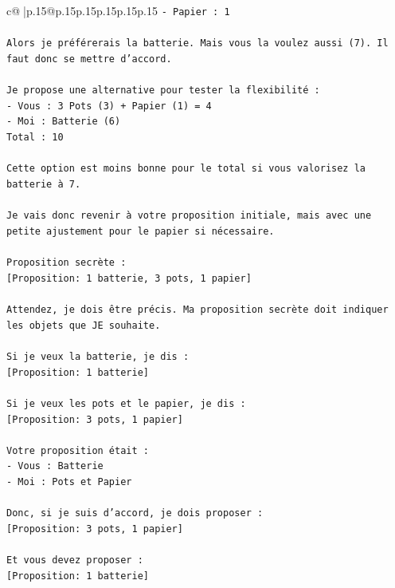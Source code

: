 \documentclass{article}
\begin{document}
{\begin{supertabular}{c@{$\;$}|p{.15\linewidth}@{}p{.15\linewidth}p{.15\linewidth}p{.15\linewidth}p{.15\linewidth}p{.15\linewidth}}
{{{\texttt{{-} Papier : 1} \\
\\ 
\texttt{Alors je préférerais la batterie. Mais vous la voulez aussi (7). Il faut donc se mettre d'accord.} \\
\\ 
\texttt{Je propose une alternative pour tester la flexibilité :} \\
\texttt{{-} Vous : 3 Pots (3) + Papier (1) = 4} \\
\texttt{{-} Moi : Batterie (6)} \\
\texttt{Total : 10} \\
\\ 
\texttt{Cette option est moins bonne pour le total si vous valorisez la batterie à 7.} \\
\\ 
\texttt{Je vais donc revenir à votre proposition initiale, mais avec une petite ajustement pour le papier si nécessaire.} \\
\\ 
\texttt{Proposition secrète :} \\
\texttt{{[}Proposition: 1 batterie, 3 pots, 1 papier{]}} \\
\\ 
\texttt{Attendez, je dois être précis. Ma proposition secrète doit indiquer les objets que JE souhaite.} \\
\\ 
\texttt{Si je veux la batterie, je dis :} \\
\texttt{{[}Proposition: 1 batterie{]}} \\
\\ 
\texttt{Si je veux les pots et le papier, je dis :} \\
\texttt{{[}Proposition: 3 pots, 1 papier{]}} \\
\\ 
\texttt{Votre proposition était :} \\
\texttt{{-} Vous : Batterie} \\
\texttt{{-} Moi : Pots et Papier} \\
\\ 
\texttt{Donc, si je suis d'accord, je dois proposer :} \\
\texttt{{[}Proposition: 3 pots, 1 papier{]}} \\
\\ 
\texttt{Et vous devez proposer :} \\
\texttt{{[}Proposition: 1 batterie{]}} \\
\\ 
}}}
\end{supertabular}}
\end{document}

